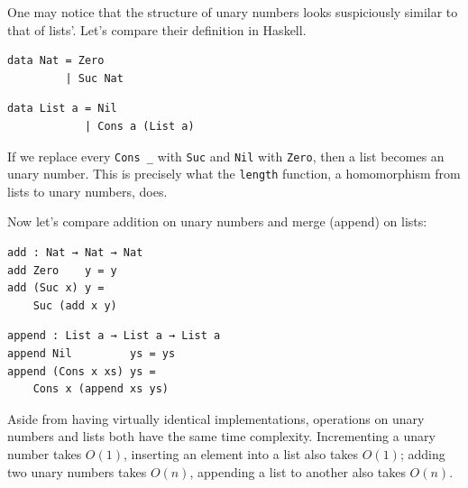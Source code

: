 \documentclass[../thesis.tex]{subfiles}
\begin{document}
One may notice that the structure of unary numbers looks suspiciously similar
to that of lists'. Let's compare their definition in Haskell.

\noindent\begin{minipage}{.45\textwidth}
\begin{lstlisting}
data Nat = Zero
         | Suc Nat
\end{lstlisting}
\end{minipage}\hfill
\begin{minipage}{.48\textwidth}
\begin{lstlisting}
data List a = Nil
            | Cons a (List a)
\end{lstlisting}
\end{minipage}

If we replace every {\lstinline|Cons _|} with {\lstinline|Suc|} and
{\lstinline|Nil|} with {\lstinline|Zero|}, then a list becomes an unary number.
This is precisely what the {\lstinline|length|} function,
a homomorphism from lists to unary numbers, does.



Now let's compare addition on unary numbers and merge (append) on lists:

\noindent\begin{minipage}{.45\textwidth}
\begin{lstlisting}[basicstyle=\ttfamily\scriptsize]
add : Nat → Nat → Nat
add Zero    y = y
add (Suc x) y =
    Suc (add x y)
\end{lstlisting}
\end{minipage}\hfill
\begin{minipage}{.48\textwidth}
\begin{lstlisting}[basicstyle=\ttfamily\scriptsize]
append : List a → List a → List a
append Nil         ys = ys
append (Cons x xs) ys =
    Cons x (append xs ys)
\end{lstlisting}
\end{minipage}

Aside from having virtually identical implementations, operations on unary numbers
and lists both have the same time complexity. Incrementing a unary number takes
$ O(1) $, inserting an element into a list also takes $ O(1) $; adding two unary
numbers takes $ O(n) $, appending a list to another also takes $ O(n) $.
\end{document}
